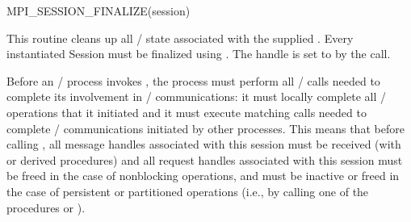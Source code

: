 \begin{funcdef}{MPI\_SESSION\_FINALIZE}{(\mbox{session})}
\end{funcdef}

\noindent
This routine cleans up all \MPI/ state associated with the supplied .
Every instantiated Session must be finalized using .
The handle  is set to  by the call.

Before an \MPI/ process invokes , the process must
perform all \MPI/ calls needed to complete its
involvement in \MPI/ communications: it must locally complete all
\MPI/ operations that it initiated and it must execute matching calls needed to complete \MPI/
communications initiated by other processes.
This means that before calling , all message handles associated
with this session must be received
(with  or derived procedures)
and all request handles associated with this session must be freed
in the case of nonblocking operations,
and must be inactive or freed in the case of persistent or partitioned operations
(i.e., by calling one of the procedures
%
%
%
%
%
%
%
%
or ).

